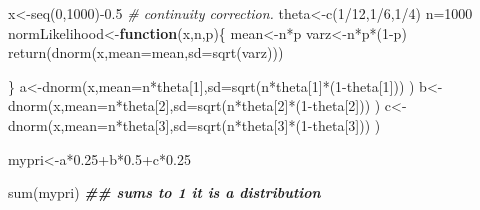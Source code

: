 \documentclass[
]{book}
\newenvironment{Shaded}{\begin{snugshade}}{\end{snugshade}}
\newcommand{\AttributeTok}[1]{\textcolor[rgb]{0.77,0.63,0.00}{#1}}
\newcommand{\CommentTok}[1]{\textcolor[rgb]{0.56,0.35,0.01}{\textit{#1}}}
\newcommand{\ControlFlowTok}[1]{\textcolor[rgb]{0.13,0.29,0.53}{\textbf{#1}}}
\newcommand{\DecValTok}[1]{\textcolor[rgb]{0.00,0.00,0.81}{#1}}
\newcommand{\DocumentationTok}[1]{\textcolor[rgb]{0.56,0.35,0.01}{\textbf{\textit{#1}}}}
\newcommand{\FloatTok}[1]{\textcolor[rgb]{0.00,0.00,0.81}{#1}}
\newcommand{\FunctionTok}[1]{\textcolor[rgb]{0.00,0.00,0.00}{#1}}
\newcommand{\NormalTok}[1]{#1}
\newcommand{\OtherTok}[1]{\textcolor[rgb]{0.56,0.35,0.01}{#1}}
\newcommand{\SpecialCharTok}[1]{\textcolor[rgb]{0.00,0.00,0.00}{#1}}
\theoremstyle{definition}
\theoremstyle{definition}
\theoremstyle{definition}
\theoremstyle{definition}
\theoremstyle{remark}
\begin{document}
\begin{Shaded}
\begin{Highlighting}[]
\NormalTok{x}\OtherTok{\textless{}{-}}\FunctionTok{seq}\NormalTok{(}\DecValTok{0}\NormalTok{,}\DecValTok{1000}\NormalTok{)}\SpecialCharTok{{-}}\FloatTok{0.5} \CommentTok{\# continuity correction.}
\NormalTok{theta}\OtherTok{\textless{}{-}}\FunctionTok{c}\NormalTok{(}\DecValTok{1}\SpecialCharTok{/}\DecValTok{12}\NormalTok{,}\DecValTok{1}\SpecialCharTok{/}\DecValTok{6}\NormalTok{,}\DecValTok{1}\SpecialCharTok{/}\DecValTok{4}\NormalTok{)}
\NormalTok{n}\OtherTok{=}\DecValTok{1000}
\NormalTok{normLikelihood}\OtherTok{\textless{}{-}}\ControlFlowTok{function}\NormalTok{(x,n,p)\{}
\NormalTok{  mean}\OtherTok{\textless{}{-}}\NormalTok{n}\SpecialCharTok{*}\NormalTok{p}
\NormalTok{  varz}\OtherTok{\textless{}{-}}\NormalTok{n}\SpecialCharTok{*}\NormalTok{p}\SpecialCharTok{*}\NormalTok{(}\DecValTok{1}\SpecialCharTok{{-}}\NormalTok{p)}
  \FunctionTok{return}\NormalTok{(}\FunctionTok{dnorm}\NormalTok{(x,}\AttributeTok{mean=}\NormalTok{mean,}\AttributeTok{sd=}\FunctionTok{sqrt}\NormalTok{(varz)))}
  
\NormalTok{\}}
\NormalTok{a}\OtherTok{\textless{}{-}}\FunctionTok{dnorm}\NormalTok{(x,}\AttributeTok{mean=}\NormalTok{n}\SpecialCharTok{*}\NormalTok{theta[}\DecValTok{1}\NormalTok{],}\AttributeTok{sd=}\FunctionTok{sqrt}\NormalTok{(n}\SpecialCharTok{*}\NormalTok{theta[}\DecValTok{1}\NormalTok{]}\SpecialCharTok{*}\NormalTok{(}\DecValTok{1}\SpecialCharTok{{-}}\NormalTok{theta[}\DecValTok{1}\NormalTok{]))  )}
\NormalTok{b}\OtherTok{\textless{}{-}}\FunctionTok{dnorm}\NormalTok{(x,}\AttributeTok{mean=}\NormalTok{n}\SpecialCharTok{*}\NormalTok{theta[}\DecValTok{2}\NormalTok{],}\AttributeTok{sd=}\FunctionTok{sqrt}\NormalTok{(n}\SpecialCharTok{*}\NormalTok{theta[}\DecValTok{2}\NormalTok{]}\SpecialCharTok{*}\NormalTok{(}\DecValTok{1}\SpecialCharTok{{-}}\NormalTok{theta[}\DecValTok{2}\NormalTok{]))  )}
\NormalTok{c}\OtherTok{\textless{}{-}}\FunctionTok{dnorm}\NormalTok{(x,}\AttributeTok{mean=}\NormalTok{n}\SpecialCharTok{*}\NormalTok{theta[}\DecValTok{3}\NormalTok{],}\AttributeTok{sd=}\FunctionTok{sqrt}\NormalTok{(n}\SpecialCharTok{*}\NormalTok{theta[}\DecValTok{3}\NormalTok{]}\SpecialCharTok{*}\NormalTok{(}\DecValTok{1}\SpecialCharTok{{-}}\NormalTok{theta[}\DecValTok{3}\NormalTok{]))  )}


\NormalTok{mypri}\OtherTok{\textless{}{-}}\NormalTok{a}\SpecialCharTok{*}\FloatTok{0.25}\SpecialCharTok{+}\NormalTok{b}\SpecialCharTok{*}\FloatTok{0.5}\SpecialCharTok{+}\NormalTok{c}\SpecialCharTok{*}\FloatTok{0.25}

\FunctionTok{sum}\NormalTok{(mypri) }\DocumentationTok{\#\# sums to 1 it is a distribution}
\end{Highlighting}
\end{Shaded}
\end{document}
